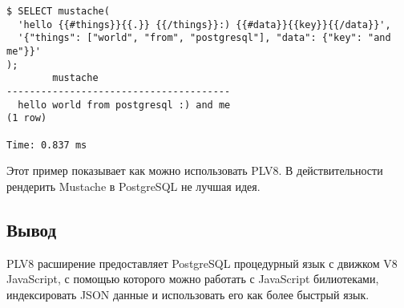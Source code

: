 \begin{lstlisting}[label=lst:plv8js16,caption=Рендер темплейтов]
$ SELECT mustache(
  'hello {{#things}}{{.}} {{/things}}:) {{#data}}{{key}}{{/data}}',
  '{"things": ["world", "from", "postgresql"], "data": {"key": "and me"}}'
);
		mustache
---------------------------------------
  hello world from postgresql :) and me
(1 row)

Time: 0.837 ms
\end{lstlisting}

Этот пример показывает как можно использовать PLV8. В действительности рендерить Mustache в PostgreSQL не лучшая идея.

\subsection{Вывод}

PLV8 расширение предоставляет PostgreSQL процедурный язык с движком V8 JavaScript, с помощью которого можно работать с JavaScript билиотеками, индексировать JSON данные и использовать его как более быстрый язык.